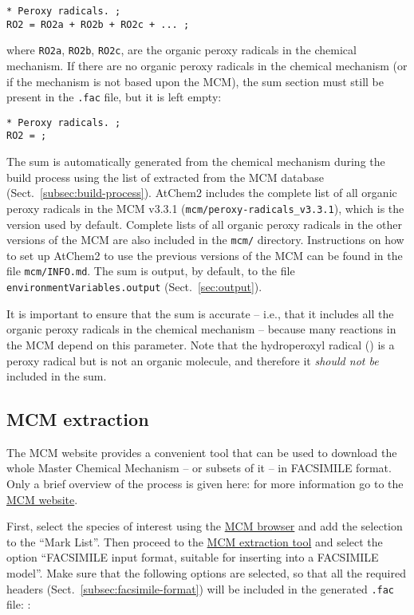 \begin{verbatim}
* Peroxy radicals. ;
RO2 = RO2a + RO2b + RO2c + ... ;
\end{verbatim}

where \texttt{RO2a}, \texttt{RO2b}, \texttt{RO2c}, are the organic
peroxy radicals in the chemical mechanism. If there are no organic
peroxy radicals in the chemical mechanism (or if the mechanism is not
based upon the MCM), the  sum section must still be present in
the \texttt{.fac} file, but it is left empty:

\begin{verbatim}
* Peroxy radicals. ;
RO2 = ;
\end{verbatim}

The  sum is automatically generated from the chemical
mechanism during the build process using the list of 
extracted from the MCM database (Sect.~\ref{subsec:build-process}).
AtChem2 includes the complete list of all organic peroxy radicals in
the MCM v3.3.1 (\texttt{mcm/peroxy-radicals\_v3.3.1}), which is the
version used by default. Complete lists of all organic peroxy radicals
in the other versions of the MCM are also included in the
\texttt{mcm/} directory. Instructions on how to set up AtChem2 to use
the previous versions of the MCM can be found in the file
\texttt{mcm/INFO.md}. The  sum is output, by default, to the
file \texttt{environmentVariables.output} (Sect.~\ref{sec:output}).

It is important to ensure that the  sum is accurate -- i.e.,
that it includes all the organic peroxy radicals in the chemical
mechanism -- because many reactions in the MCM depend on this
parameter. Note that the hydroperoxyl radical () is a peroxy
radical but is not an organic molecule, and therefore it
\emph{should not be} included in the  sum.

\subsection{MCM extraction} \label{subsec:mcm-extraction}

The MCM website provides a convenient tool that can be used to
download the whole Master Chemical Mechanism -- or subsets of it -- in
FACSIMILE format. Only a brief overview of the process is given here:
for more information go to the \href{http://mcm.leeds.ac.uk/}{MCM website}.

First, select the species of interest using the
\href{http://mcm.leeds.ac.uk/MCM/roots.htt}{MCM browser} and add the
selection to the ``Mark List''. Then proceed to the
\href{http://mcm.leeds.ac.uk/MCM/extract.htt}{MCM extraction tool} and
select the option ``FACSIMILE input format, suitable for inserting
into a FACSIMILE model''. Make sure that the following options are
selected, so that all the required headers (Sect.~\ref{subsec:facsimile-format})
will be included in the generated \texttt{.fac} file: :

